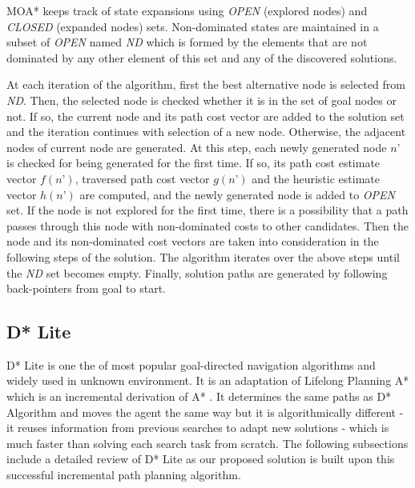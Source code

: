 \documentclass[10pt,journal]{IEEEtran}
\begin{document}
MOA* keeps track of state expansions using {\it OPEN} (explored nodes) and {\it CLOSED} (expanded nodes) sets. Non-dominated states are maintained in a subset of {\it OPEN} named {\it ND} which is formed by the elements that are not dominated by any other element of this set and any of the discovered solutions.

At each iteration of the algorithm, first the best alternative node is selected from {\it ND}. Then, the selected node is checked whether it is in the set of goal nodes or not. If so, the current node and its path cost vector are added to the solution set and the iteration continues with selection of a new node. Otherwise, the adjacent nodes of current node are generated. At this step, each newly generated node $n’$ is checked for being generated for the first time. If so, its path cost estimate vector $f(n’)$, traversed path cost vector $g(n’)$ and the heuristic estimate vector $h(n’)$ are computed, and the newly generated node is added to {\it OPEN} set. If the node is not explored for the first time, there is a possibility that a path passes through this node with non-dominated costs to other candidates. Then the node and its non-dominated cost vectors are taken into consideration in the following steps of the solution. The algorithm iterates over the above steps until the {\it ND} set becomes empty. Finally, solution paths are generated by following back-pointers from goal to start. 


\subsection{D* Lite}

D* Lite \cite{Koenig:2002} is one the of most popular goal-directed navigation algorithms and widely used in unknown environment. It is an adaptation of Lifelong Planning A* \cite{LPAStarKoenig:2004} which is an incremental derivation of A* \cite{AStarHart:1968}. It determines the same paths as D* Algorithm \cite{DStar:1994} and moves the agent the same way but it is algorithmically different - it reuses information from previous searches to adapt new solutions - which is much faster than solving each search task from scratch.
The following subsections include a detailed review of D* Lite as our proposed solution is built upon this successful incremental path planning algorithm.
\end{document}
